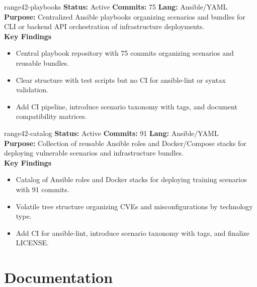 \documentclass[aspectratio=169]{beamer}
\begin{document}
\begin{frame}{range42-playbooks \; \faCubes}
  \textbf{Status:} Active \hfill \textbf{Commits:} 75 \hfill \textbf{Lang:} Ansible/YAML\\[2mm]
  \textbf{Purpose:} Centralized Ansible playbooks organizing scenarios and bundles for CLI or backend API orchestration of infrastructure deployments.\\[2mm]
  \textbf{Key Findings}
  \begin{itemize}
    \item Central playbook repository with 75 commits organizing scenarios and reusable bundles.
    \item Clear structure with test scripts but no CI for ansible-lint or syntax validation.
    \item Add CI pipeline, introduce scenario taxonomy with tags, and document compatibility matrices.
  \end{itemize}
\end{frame}

\begin{frame}{range42-catalog \; \faBoxes}
  \textbf{Status:} Active \hfill \textbf{Commits:} 91 \hfill \textbf{Lang:} Ansible/YAML\\[2mm]
  \textbf{Purpose:} Collection of reusable Ansible roles and Docker/Compose stacks for deploying vulnerable scenarios and infrastructure bundles.\\[2mm]
  \textbf{Key Findings}
  \begin{itemize}
    \item Catalog of Ansible roles and Docker stacks for deploying training scenarios with 91 commits.
    \item Volatile tree structure organizing CVEs and misconfigurations by technology type.
    \item Add CI for ansible-lint, introduce scenario taxonomy with tags, and finalize LICENSE.
  \end{itemize}
\end{frame}

\section{Documentation}
\end{document}
